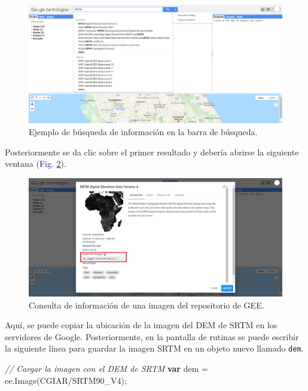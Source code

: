 \documentclass[
  12pt,
  letterpaper,
  twoside]{book}
\newenvironment{Shaded}{\begin{snugshade}}{\end{snugshade}}
\newcommand{\CommentTok}[1]{\textcolor[rgb]{0.24,0.58,0.00}{\textit{#1}}}
\newcommand{\FunctionTok}[1]{\textcolor[rgb]{0.48,0.12,0.64}{#1}}
\newcommand{\KeywordTok}[1]{\textcolor[rgb]{0.00,0.00,0.00}{\textbf{#1}}}
\newcommand{\NormalTok}[1]{#1}
\newcommand{\OperatorTok}[1]{\textcolor[rgb]{0.00,0.00,0.00}{#1}}
\newcommand{\StringTok}[1]{\textcolor[rgb]{0.87,0.29,0.22}{#1}}
\begin{document}
\begin{figure}[H]

{\centering \includegraphics[width=0.95\linewidth]{Img/SRTM} 

}

\caption{Ejemplo de búsqueda de información en la barra de búsqueda.}\label{fig:f910}
\end{figure}

Posteriormente se da clic sobre el primer resultado y debería abrirse la siguiente ventana (\textcolor{darkblue}{Fig.} \ref{fig:f911}).

\begin{figure}[H]

{\centering \includegraphics[width=0.95\linewidth]{Img/SRTM_prop} 

}

\caption{Consulta de información de una imagen del repositorio de GEE.}\label{fig:f911}
\end{figure}

Aquí, se puede copiar la ubicación de la imagen del DEM de SRTM en los servidores de Google. Posteriormente, en la pantalla de rutinas se puede escribir la siguiente línea para guardar la imagen SRTM en un objeto nuevo llamado \texttt{dem}.

\begin{Shaded}
\begin{Highlighting}[]
\CommentTok{// Cargar la imagen con el DEM de SRTM}
\KeywordTok{var}\NormalTok{ dem }\OperatorTok{=}\NormalTok{ ee}\OperatorTok{.}\FunctionTok{Image}\NormalTok{(}\StringTok{\textquotesingle{}CGIAR/SRTM90\_V4\textquotesingle{}}\NormalTok{)}\OperatorTok{;}
\end{Highlighting}
\end{Shaded}
\end{document}
